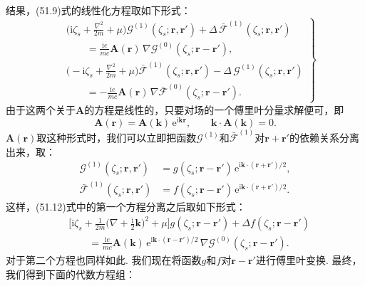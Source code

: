 结果，(51.9)式的线性化方程取如下形式：
\begin{equation}
\left.\begin{aligned}
&\biggl(\mathrm{i}\zeta_s+\frac{\nabla^2}{2m}+\mu\biggr)
\mathcal{G}^{(1)}(\zeta_s;\bm{r},\bm{r}')
+\Delta\,\bar{\mathcal{F}}^{(1)}(\zeta_s;\bm{r},\bm{r}')\\
&\qquad=\frac{\mathrm{i}e}{mc}\bm{A}(\bm{r})\,
\nabla\mathcal{G}^{(0)}(\zeta_s;\bm{r}-\bm{r}'),\\
&\biggl(-\mathrm{i}\zeta_s+\frac{\nabla^2}{2m}+\mu\biggr)
\bar{\mathcal{F}}^{(1)}(\zeta_s;\bm{r},\bm{r}')
-\Delta\,\mathcal{G}^{(1)}(\zeta_s;\bm{r},\bm{r}')\\
&\qquad=-\frac{\mathrm{i}e}{mc}\bm{A}(\bm{r})\,
\nabla\bar{\mathcal{F}}^{(0)}(\zeta_s;\bm{r}-\bm{r}').
\end{aligned}\right\}
\end{equation}
由于这两个关于$\bm{A}$的方程是线性的，只要对场的一个傅里叶分量求解便可，即
\begin{equation}
\bm{A}(\bm{r})=\bm{A}(\bm{k})\,\mathrm{e}^{\mathrm{i}\bm{k}\bm{r}},
\qquad \bm{k}\cdot\bm{A}(\bm{k})=0.
\end{equation}
$\bm{A}(\bm{r})$取这种形式时，我们可以立即把函数$\mathcal{G}^{(1)}$和$\bar{\mathcal{F}}^{(1)}$对$\bm{r}+\bm{r}'$的依赖关系分离出来，取：
\begin{equation}
\begin{aligned}
\mathcal{G}^{(1)}(\zeta_s;\bm{r},\bm{r}')
&=g(\zeta_s;\bm{r}-\bm{r}')\,\mathrm{e}^{\mathrm{i}\bm{k}\cdot(\bm{r}+\bm{r}')/2},\\
\bar{\mathcal{F}}^{(1)}(\zeta_s;\bm{r},\bm{r}')
&=f(\zeta_s;\bm{r}-\bm{r}')\,\mathrm{e}^{\mathrm{i}\bm{k}\cdot(\bm{r}+\bm{r}')/2}.
\end{aligned}
\end{equation}
这样，(51.12)式中的第一个方程分离之后取如下形式：
\begin{equation*}
\begin{aligned}
&\biggl[\mathrm{i}\zeta_s+\frac{1}{2m}\biggl(\nabla+\frac{\mathrm{i}}{2}\bm{k}\biggr)^{\!2}+\mu\biggr]
g(\zeta_s;\bm{r}-\bm{r}')
+\Delta f(\zeta_s;\bm{r}-\bm{r}')\\
&\qquad=\frac{\mathrm{i}e}{mc}\bm{A}(\bm{k})\,
\mathrm{e}^{\mathrm{i}\bm{k}\cdot(\bm{r}-\bm{r}')/2}\,
\nabla\mathcal{G}^{(0)}(\zeta_s;\bm{r}-\bm{r}').
\end{aligned}
\end{equation*}
对于第二个方程也同样如此. 我们现在将函数$g$和$f$对$\bm{r}-\bm{r}'$进行傅里叶变换. 最终，我们得到下面的代数方程组：
